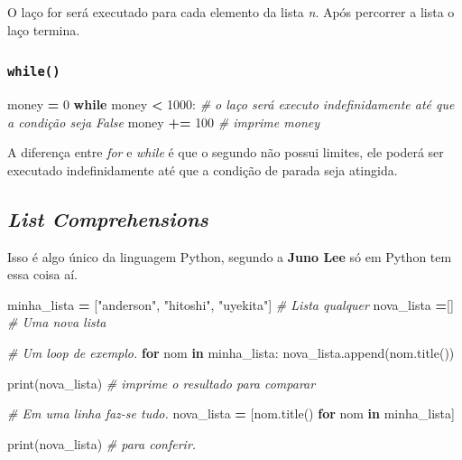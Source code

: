 \documentclass[]{book}
\newenvironment{Shaded}{\begin{snugshade}}{\end{snugshade}}
\newcommand{\KeywordTok}[1]{\textcolor[rgb]{0.13,0.29,0.53}{\textbf{#1}}}
\newcommand{\DecValTok}[1]{\textcolor[rgb]{0.00,0.00,0.81}{#1}}
\newcommand{\StringTok}[1]{\textcolor[rgb]{0.31,0.60,0.02}{#1}}
\newcommand{\CommentTok}[1]{\textcolor[rgb]{0.56,0.35,0.01}{\textit{#1}}}
\newcommand{\ControlFlowTok}[1]{\textcolor[rgb]{0.13,0.29,0.53}{\textbf{#1}}}
\newcommand{\OperatorTok}[1]{\textcolor[rgb]{0.81,0.36,0.00}{\textbf{#1}}}
\newcommand{\BuiltInTok}[1]{#1}
\newcommand{\NormalTok}[1]{#1}
\begin{document}
O laço for será executado para cada elemento da lista \emph{n}. Após
percorrer a lista o laço termina.

\subsubsection{\texorpdfstring{\texttt{while()}}{while()}}\label{while}

\begin{Shaded}
\begin{Highlighting}[]
\NormalTok{money }\OperatorTok{=} \DecValTok{0}
\ControlFlowTok{while}\NormalTok{ money }\OperatorTok{<} \DecValTok{1000}\NormalTok{:     }\CommentTok{# o laço será executo indefinidamente até que a condição seja False}
\NormalTok{    money }\OperatorTok{+=} \DecValTok{100}        \CommentTok{# imprime money}
\end{Highlighting}
\end{Shaded}

A diferença entre \emph{for} e \emph{while} é que o segundo não possui
limites, ele poderá ser executado indefinidamente até que a condição de
parada seja atingida.

\subsection{\texorpdfstring{\emph{List
Comprehensions}}{List Comprehensions}}\label{list-comprehensions}

Isso é algo único da linguagem Python, segundo a \textbf{Juno Lee} só em
Python tem essa coisa aí.

\begin{Shaded}
\begin{Highlighting}[]
\NormalTok{minha_lista }\OperatorTok{=}\NormalTok{ [}\StringTok{"anderson"}\NormalTok{, }\StringTok{"hitoshi"}\NormalTok{, }\StringTok{"uyekita"}\NormalTok{] }\CommentTok{# Lista qualquer}
\NormalTok{nova_lista }\OperatorTok{=}\NormalTok{[] }\CommentTok{# Uma nova lista}

\CommentTok{# Um loop de exemplo.}
\ControlFlowTok{for}\NormalTok{ nom }\KeywordTok{in}\NormalTok{ minha_lista:}
\NormalTok{    nova_lista.append(nom.title())}

\BuiltInTok{print}\NormalTok{(nova_lista) }\CommentTok{# imprime o resultado para comparar}

\CommentTok{# Em uma linha faz-se tudo.}
\NormalTok{nova_lista }\OperatorTok{=}\NormalTok{ [nom.title() }\ControlFlowTok{for}\NormalTok{ nom }\KeywordTok{in}\NormalTok{ minha_lista]}

\BuiltInTok{print}\NormalTok{(nova_lista) }\CommentTok{# para conferir.}
\end{Highlighting}
\end{Shaded}
\end{document}
